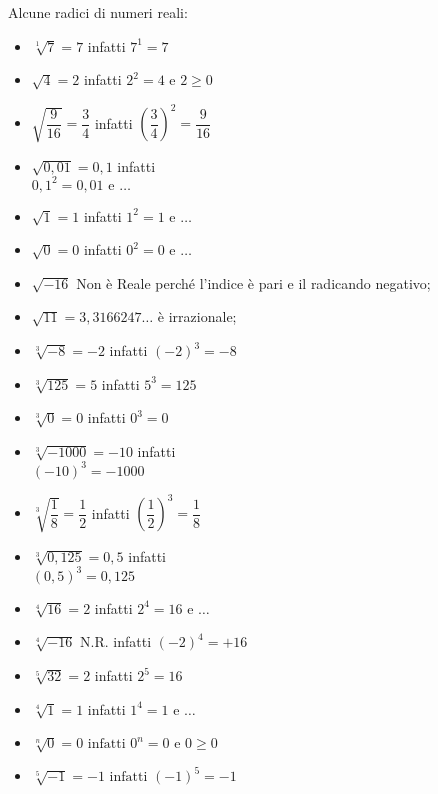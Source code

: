 % 
\begin{esempio}{}{}
Alcune radici di numeri reali:
\begin{htmulticols}{2}
\begin{itemize} [left=0mm]
\item \(\sqrt[1]{7}={7}\) infatti \(7^1=7\)
\item \(\sqrt 4=2\) infatti \(2^2=4 \text{ e } 2 \geqslant 0\)
\item \(\sqrt{\dfrac 9{16}}=\dfrac 3 4\) infatti 
\(\left(\dfrac 3 4\right)^2=\dfrac 9{16}\)
\item \(\sqrt{0,01}=0,1\) infatti \\
\(0,1^2=0,01 \text{ e } \dots\)
\item \(\sqrt 1=1\) infatti \(1^2=1 \text{ e } \dots\)
\item \(\sqrt 0=0\) infatti \(0^2=0 \text{ e } \dots\)
\item \(\sqrt{-16}\) 
Non è Reale perché l'indice è pari e il radicando negativo;
\item \(\sqrt{11}=3,3166247\!\!\dots\) è irrazionale;
\item \(\sqrt[3]{-8}=-2\) infatti \(\left(-2\right)^3=-8\)
\item \(\sqrt[3]{125}=5\) infatti \(5^3=125\)
\item \(\sqrt[3]0=0\) infatti \(0^3=0\)
\item \(\sqrt[3]{-1000}=-10\) infatti \\
\(\left(-10\right)^3=-1000\)
\item \(\sqrt[3]{\dfrac 1 8}=\dfrac 1 2\) infatti 
\(\left(\dfrac 1 2\right)^3=\dfrac 1 8\)
\item \(\sqrt[3]{0,125}=0,5\) infatti \\
\((0,5)^3=0,125\)
\item \(\sqrt[4]{16}=2\) infatti \(2^4=16 \text{ e } \dots\)
\item \(\sqrt[4]{-16}\) N.R. infatti \((-2)^4=+16\)
\item \(\sqrt[5]{32}=2\) infatti \(2^5=16\)
\item \(\sqrt[4]1=1\) infatti \(1^4=1 \text{ e } \dots\)
\item \(\sqrt[n]0=0 \text{ infatti } 0^n=0 \text{ e } 0 \geqslant 0\)
\item \(\sqrt[5]{-1}=-1 \text{ infatti } (-1)^5=-1\)
\end{itemize}
\end{htmulticols}
\end{esempio}
% 

